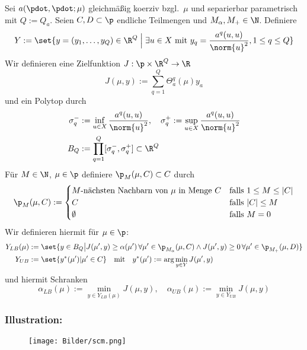 \begin{defn}[SCM]
	Sei $a(\pdot,\pdot;\mu)$ gleichmäßig koerziv bzgl.\ $\mu$ und separierbar parametrisch mit $Q := Q_a$.
	Seien $C, D \subset \p$ endliche Teilmengen und $M_\alpha, M_+ \in \N$.
	Definiere
	\[
		Y := \set{y = (y_1,\ldots,y_Q) \in \R^Q \;\Big|\; \exists u \in X \text{ mit } y_q = \frac{a^q(u,u)}{\norm{u}^2}, 1 \leq q \leq Q}
	\]
	Wir definieren eine Zielfunktion $J : \p \times \R^Q \to \R$
	\[
		J(\mu,y) := \sum_{q=1}^Q \Theta_a^q(\mu) y_a
	\]
	und ein Polytop durch
	\begin{align*}
		\sigma_q^- &:= \inf_{u \in X} \frac{a^q(u,u)}{\norm{u}^2}, \quad \sigma_q^+ := \sup_{u \in X} \frac{a^q(u,u)}{\norm{u}^2}\\
		B_Q &:= \prod_{q=1}^Q [\sigma_q^-,\sigma_q^+] \subset \R^Q
	\end{align*}
	Für $M \in \N$, $\mu \in \p$ definiere $\p_M(\mu,C) \subset C$ durch
	\[
		\p_M(\mu,C) := \begin{cases}
			\text{$M$-nächsten Nachbarn von $\mu$ in Menge $C$} & \text{falls } 1 \leq M \leq |C|\\
			C & \text{falls } |C| \leq M\\
			\emptyset & \text{falls } M = 0
		\end{cases}
	\]
	Wir definieren hiermit für $\mu \in \p$:
	\begin{align*}
		Y_{LB}(\mu) &:= \set{y \in B_Q \big| J(\mu',y) \geq \alpha(\mu') \, \forall \mu' \in \p_{M_\alpha}(\mu,C) \wedge J(\mu',y) \geq 0 \, \forall \mu' \in \p_{M_+}(\mu,D)}\\
		Y_{UB} &:= \set{y^*(\mu') | \mu' \in C} \quad \text{mit} \quad y^*(\mu') := \arg\min_{y \in Y} J(\mu',y)
	\end{align*}
	und hiermit Schranken
	\[
		\alpha_{LB}(\mu) := \min_{y \in Y_{LB}(\mu)} J(\mu,y), \quad \alpha_{UB}(\mu) := \min_{y \in Y_{UB}} J(\mu,y)
	\]
\end{defn}

\subsubsection*{Illustration:}
\begin{figure}[H]
	\centering\small
	\texttt{[image: Bilder/scm.png]}
\end{figure}

